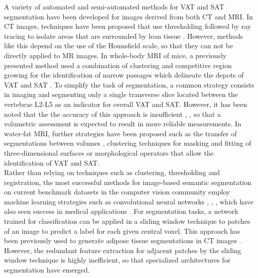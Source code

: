\documentclass[10pt,letterpaper]{article}
\begin{document}
	A variety of automated and semi-automated methods for VAT and SAT segmentation have been developed for images derived from both CT and MRI. In CT images, techniques have been proposed that use thresholding followed by ray tracing to isolate areas that are surrounded by lean tissue \cite{kullberg2017automated}. However, methods like this depend on the use of the Hounsfield scale, so that they can not be directly applied to MR images.
	In whole-body MRI of mice, a previously presented method used a combination of clustering and competitive region growing for the identification of narrow passages which delineate the depots of VAT and SAT \cite{ranefall2009automatic}. To simplify the task of segmentation, a common strategy consists in imaging and segmenting only a single transverse slice located between the vertebrae L2-L5 as an indicator for overall VAT and SAT. However, it has been noted that the the accuracy of this approach is insufficient \cite{addeman2015validation}, \cite{shen2016automatic}, so that a volumetric assessment is expected to result in more reliable measurements. In water-fat MRI, further strategies have been proposed such as the transfer of segmentations between volumes \cite{joshi2013automatic}, clustering techniques for masking and fitting of three-dimensional surfaces \cite{addeman2015validation} or morphological operators that allow the identification of VAT and SAT. \\

	Rather than relying on techniques such as clustering, thresholding and registration, the most successful methods for image-based semantic segmentation on current benchmark datasets in the computer vision community employ machine learning strategies such as convolutional neural networks \cite{everingham2015pascal}, \cite{garcia2017review}, \cite{lecun2015deep}, which have also seen success in medical applications \cite{shen2017deep}. For segmentation tasks, a network trained for classification can be applied in a sliding window technique to patches of an image to predict a label for each given central voxel. This approach has been previously used to generate adipose tissue segmentations in CT images \cite{wang2017two}. However, the redundant feature extraction for adjacent patches by the sliding window technique is highly inefficient, so that specialized architectures for segmentation have emerged.
\end{document}
